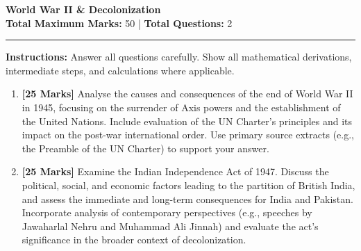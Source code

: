 \documentclass[11pt,a4paper]{article}
\begin{document}
\begin{center}
    {\LARGE \textbf{ World War II & Decolonization }} \\[0.5em]
    \textbf{Total Maximum Marks:} 50 \quad | \quad \textbf{Total Questions:} 2
\end{center}

\vspace{1em}
\hrule
\vspace{1.5em}

\noindent \textbf{Instructions:} Answer all questions carefully. Show all mathematical derivations, intermediate steps, and calculations where applicable.

\vspace{1.5em}

\begin{enumerate}[label=\textbf{Q\arabic*.}, leftmargin=2em]

    \item \textbf{[25 Marks]} Analyse the causes and consequences of the end of World War II in 1945, focusing on the surrender of Axis powers and the establishment of the United Nations. Include evaluation of the UN Charter's principles and its impact on the post-war international order. Use primary source extracts (e.g., the Preamble of the UN Charter) to support your answer.
    
    \vspace{1em}

    \item \textbf{[25 Marks]} Examine the Indian Independence Act of 1947. Discuss the political, social, and economic factors leading to the partition of British India, and assess the immediate and long-term consequences for India and Pakistan. Incorporate analysis of contemporary perspectives (e.g., speeches by Jawaharlal Nehru and Muhammad Ali Jinnah) and evaluate the act's significance in the broader context of decolonization.
    
    \vspace{1em}

\end{enumerate}
\end{document}
